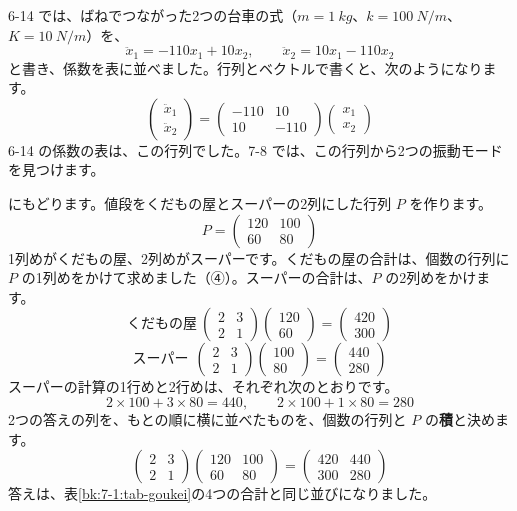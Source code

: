 6-14 では、ばねでつながった2つの台車の式（$m=\qty{1}{kg}$、$k=\qty{100}{N/m}$、$K=\qty{10}{N/m}$）を、
\[ \ddot x_1=-110x_1+10x_2,\qquad \ddot x_2=10x_1-110x_2 \]
と書き、係数を表に並べました。行列とベクトルで書くと、次のようになります。
\[ \begin{pmatrix} \ddot x_1\\ \ddot x_2 \end{pmatrix}=\begin{pmatrix} -110 & 10\\ 10 & -110 \end{pmatrix}\begin{pmatrix} x_1\\ x_2 \end{pmatrix} \]
6-14 の係数の表は、この行列でした。7-8 では、この行列から2つの振動モードを見つけます。


\label{bk:7-1:seki}\bkhatenaref にもどります。値段をくだもの屋とスーパーの2列にした行列 $P$ を作ります。
\[ P=\begin{pmatrix} 120 & 100\\ 60 & 80 \end{pmatrix} \]
1列めがくだもの屋、2列めがスーパーです。くだもの屋の合計は、個数の行列に $P$ の1列めをかけて求めました（④）。スーパーの合計は、$P$ の2列めをかけます。
\[ \text{くだもの屋}\ \begin{pmatrix} 2 & 3\\ 2 & 1 \end{pmatrix}\begin{pmatrix} 120\\ 60 \end{pmatrix}=\begin{pmatrix} 420\\ 300 \end{pmatrix} \]
\[ \text{スーパー}\ \ \begin{pmatrix} 2 & 3\\ 2 & 1 \end{pmatrix}\begin{pmatrix} 100\\ 80 \end{pmatrix}=\begin{pmatrix} 440\\ 280 \end{pmatrix} \]
スーパーの計算の1行めと2行めは、それぞれ次のとおりです。
\[ 2\times100+3\times80=440,\qquad 2\times100+1\times80=280 \]
2つの答えの列を、もとの順に横に並べたものを、個数の行列と $P$ の\textbf{積}と決めます。
\[ \begin{pmatrix} 2 & 3\\ 2 & 1 \end{pmatrix}\begin{pmatrix} 120 & 100\\ 60 & 80 \end{pmatrix}=\begin{pmatrix} 420 & 440\\ 300 & 280 \end{pmatrix} \]
答えは、表\ref{bk:7-1:tab-goukei}の4つの合計と同じ並びになりました。

